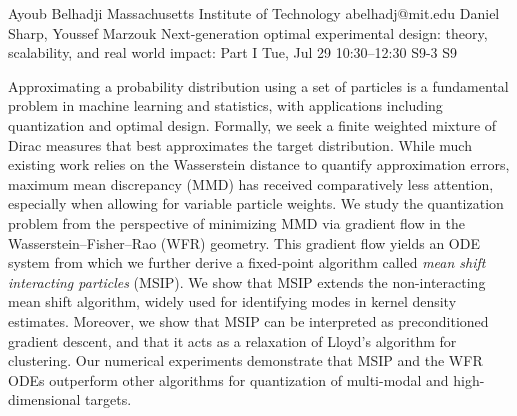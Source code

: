\begin{talk}
  {Ayoub Belhadji}%
  {Massachusetts Institute of Technology}%
  {abelhadj@mit.edu}%
  {Daniel Sharp, Youssef Marzouk}%
  {Next-generation optimal experimental design: theory, scalability, and real world impact: Part I}%
  {}%
  {Tue, Jul 29 10:30–12:30}%
  {S9-3}%
  {S9}%
				
			
Approximating a probability distribution using a set of particles is a fundamental problem in machine learning and statistics, with applications including  quantization and optimal design. Formally, we seek a finite weighted mixture of Dirac measures that best approximates the target distribution. While much existing work relies on the Wasserstein distance to quantify approximation errors, maximum mean discrepancy (MMD) has received comparatively less attention, especially when allowing for variable particle weights. We study the quantization problem from the perspective of minimizing MMD via gradient flow in the Wasserstein--Fisher--Rao (WFR) geometry. This gradient flow yields an ODE system from which we further derive a fixed-point algorithm called \emph{mean shift interacting particles} (MSIP). We show that MSIP extends the non-interacting mean shift algorithm, widely used for identifying modes in kernel density estimates. Moreover, we show that MSIP can be interpreted as preconditioned gradient descent, and that it acts as a relaxation of Lloyd's algorithm for clustering. 
Our numerical experiments demonstrate that MSIP and the WFR ODEs outperform other algorithms for quantization of multi-modal and high-dimensional targets.
\medskip


\end{talk}

